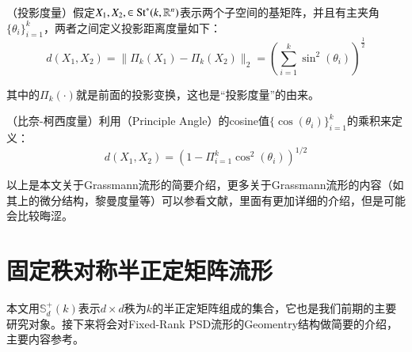 \begin{definition}
\label{Projection_metric}
{\heiti （投影度量）}假定$X_1,X_2,\in {\rm St}^{*}(k,\mathbb{R}^{n})$表示两个子空间的基矩阵，并且有主夹角$\{\theta_i\}_{i=1}^{k}$，两者之间定义投影距离度量如下：
\begin{equation}
\label{proj_dist}
d(X_1,X_2)=\|\Pi_k(X_1)-\Pi_k(X_2)\|_{2}=\left(\sum_{i=1}^{k}\sin^{2}(\theta_i)\right)^{\frac{1}{2}}
\end{equation}
\end{definition}
其中的$\Pi_k(\cdot)$就是前面的投影变换，这也是“投影度量”的由来。
\begin{definition}
\label{BC_metric}
{\heiti （比奈-柯西度量）}利用（Principle Angle）的cosine值$\{\cos(\theta_i)\}_{i=1}^{k}$的乘积来定义：
\begin{equation}
d(X_1,X_2)=\left(1-\Pi_{i=1}^{k}\cos^{2}(\theta_i)\right)^{1/2}
\end{equation}
\end{definition}
以上是本文关于Grassmann流形的简要介绍，更多关于Grassmann流形的内容（如其上的微分结构，黎曼度量等）可以参看文献\cite{Grassmann}，里面有更加详细的介绍，但是可能会比较晦涩。
\section{固定秩对称半正定矩阵流形}
\label{sec:Fixed-rank-PSD}
本文用$\mathbb{S}_{d}^{+}(k)$表示$d \times d$秩为$k$的半正定矩阵组成的集合，它也是我们前期的主要研究对象。接下来将会对Fixed-Rank PSD流形的Geomentry结构做简要的介绍，主要内容参考\cite{PSD_Riemannian}。

